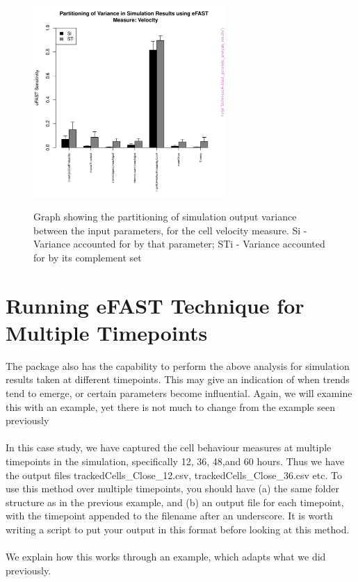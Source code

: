 \documentclass[a4paper,11pt]{article}
\begin{document}
\begin{figure}[h!]
\centering
    \includegraphics[width=0.65\textwidth]{eFAST_Velocity.pdf}\\ \noindent
    \caption{Graph showing the partitioning of simulation output variance between the input parameters, for the cell velocity measure. Si - Variance accounted for by that parameter; STi - Variance accounted for by its complement set}
    \label{eFAST_Results2}
\end{figure}


\section{Running eFAST Technique for Multiple Timepoints}
\noindent The package also has the capability to perform the above analysis for simulation results taken at different timepoints. This may give an indication of when trends tend to emerge, or certain parameters become influential. Again, we will examine this with an example, yet there is not much to change from the example seen previously\\
\\
In this case study, we have captured the cell behaviour measures at multiple timepoints in the simulation, specifically 12, 36, 48,and 60 hours.  Thus we have the output files trackedCells\_Close\_12.csv, trackedCells\_Close\_36.csv etc. To use this method over multiple timepoints, you should have (a) the same folder structure as in the previous example, and (b) an output file for each timepoint, with the timepoint appended to the filename after an underscore. It is worth writing a script to put your output in this format before looking at this method.\\
\\
We explain how this works through an example, which adapts what we did previously. 
\end{document}
